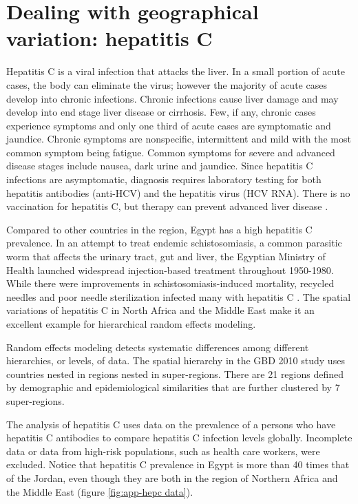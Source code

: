 \chapter{Dealing with geographical variation: hepatitis C}
\label{applications-rfx}

Hepatitis C is a viral infection that attacks the liver.  In a small portion of acute cases, the body can eliminate the virus; however the majority of acute cases develop into chronic infections.  Chronic infections cause liver damage and may develop into end stage liver disease or cirrhosis.  Few, if any, chronic cases experience symptoms and only one third of acute cases are symptomatic and jaundice.  Chronic symptoms are nonspecific, intermittent and mild with the most common symptom being fatigue.  Common symptoms for severe and advanced disease stages include nausea, dark urine and jaundice.  Since hepatitis C infections are asymptomatic, diagnosis requires laboratory testing for both hepatitis antibodies (anti-HCV) and the hepatitis virus (HCV RNA).  There is no vaccination for hepatitis C, but therapy can prevent advanced liver disease \cite{hoofnagle_hepatitis_1997, ghany_diagnosis_2009, hanafiah_global_2012}.

Compared to other countries in the region, Egypt has a high hepatitis C prevalence.  In an attempt to treat endemic schistosomiasis, a common parasitic worm that affects the urinary tract, gut and liver, the Egyptian Ministry of Health launched widespread injection-based treatment throughout 1950-1980.  While there were improvements in schistosomiasis-induced mortality, recycled needles and poor needle sterilization infected many with hepatitis C \cite{frank_role_2000, mezban_hepatitis_2006, strickland_liver_2006}.  The spatial variations of hepatitis C in North Africa and the Middle East make it an excellent example for hierarchical random effects modeling.

Random effects modeling detects systematic differences among different hierarchies, or levels, of data.  The spatial hierarchy in the GBD 2010 study uses countries nested in regions nested in super-regions.  There are 21 regions defined by demographic and epidemiological similarities that are further clustered by 7 super-regions.

The analysis of hepatitis C uses data on the prevalence of a persons who have hepatitis C antibodies to compare hepatitis C infection levels globally.  Incomplete data or data from high-risk populations, such as health care workers, were excluded.  Notice that hepatitis C prevalence in Egypt is more than 40 times that of the Jordan, even though they are both in the region of Northern Africa and the Middle East (figure \ref{fig:app-hepc data}).

